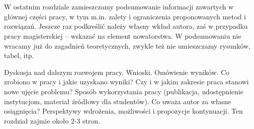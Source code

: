 \chapter{}

W ostatnim rozdziale zamieszczamy podsumowanie informacji zawartych w głównej części pracy, w tym m.in. zalety i ograniczenia proponowanych metod i rozwiązań. Jeszcze raz podkreślić należy własny wkład autora, zaś w przypadku pracy magisterskiej – wskazać na element nowatorstwa. W podsumowaniu nie wracamy już do zagadnień teoretycznych, zwykle też nie umieszczamy rysunków, tabel, itp.

Dyskusja nad dalszym rozwojem pracy. Wnioski. Omówienie wyników. Co zrobiono w pracy i jakie uzyskano wyniki? Czy i w jakim zakresie praca stanowi nowe ujęcie problemu? Sposób wykorzystania pracy (publikacja, udostępnienie instytucjom, materiał źródłowy dla studentów). Co uważa autor za własne osiągnięcia? Perspektywy wdrożenia, możliwości i propozycje kontynuacji. Ten rozdział zajmie około 2-3 stron.
